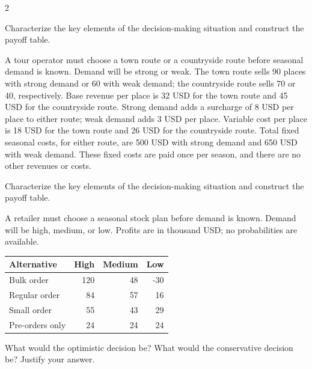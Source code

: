 \begin{multicols}{2}
\begin{minipage}{\linewidth}
Characterize the key elements of the decision-making situation  
and construct the payoff table. 

\end{minipage}\par

\begin{minipage}{\linewidth}
A tour operator must choose a town route or a countryside route before seasonal demand is known. Demand will be strong or weak. The town route sells 90 places with strong demand or 60 with weak demand; the countryside route sells 70 or 40, respectively. Base revenue per place is 32 USD for the town route and 45 USD for the countryside route. Strong demand adds a surcharge of 8 USD per place to either route; weak demand adds 3 USD per place. Variable cost per place is 18 USD for the town route and 26 USD for the countryside route. Total fixed seasonal costs, for either route, are 500 USD with strong demand and 650 USD with weak demand. These fixed costs are paid once per season, and there are no other revenues or costs.

Characterize the key elements of the decision-making situation  
and construct the payoff table. 
\end{minipage}\par

\begin{minipage}{\linewidth}
A retailer must choose a seasonal stock plan before demand is known. Demand will be high, medium, or low. Profits are in thousand USD; no probabilities are available.
\begin{center}\small\setlength{\tabcolsep}{4pt}
\begin{tabular}{@{}lrrr@{}}\toprule
Alternative&High&Medium&Low\\\midrule
Bulk order&120&48&-30\\
Regular order&84&57&16\\
Small order&55&43&29\\
Pre-orders only&24&24&24\\\bottomrule
\end{tabular}\end{center}

What would the optimistic decision be? What would the conservative decision be? Justify your answer. 
\end{minipage}\par


\end{multicols}
